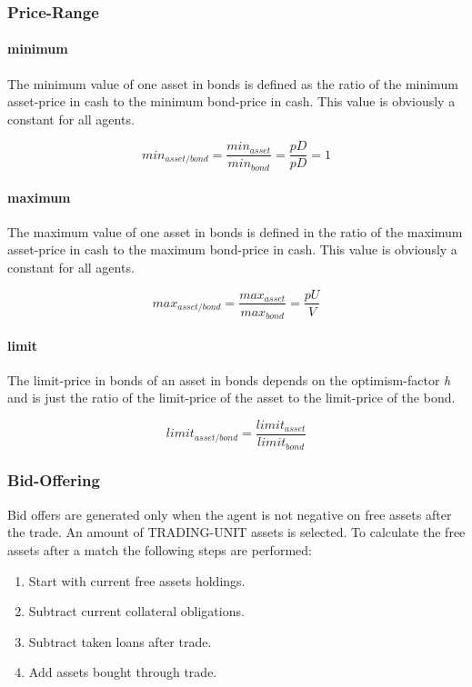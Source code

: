 \documentclass[Bachelorarbeit.tex]{subfiles}
\begin{document}
\subsubsection{Price-Range}

\paragraph{minimum}
The minimum value of one asset in bonds is defined as the ratio of the minimum asset-price in cash to the minimum bond-price in cash. This value is obviously a constant for all agents.

\begin{equation}
min_{asset/bond} = \frac{min_{asset}}{min_{bond}} = \frac{pD}{pD} = 1
\end{equation}
 
\paragraph{maximum}
The maximum value of one asset in bonds is defined in the ratio of the maximum asset-price in cash to the maximum bond-price in cash. This value is obviously a constant for all agents.

\begin{equation}
max_{asset/bond} = \frac{max_{asset}}{max_{bond}} = \frac{pU}{V}
\end{equation}

\paragraph{limit}
The limit-price in bonds of an asset in bonds depends on the optimism-factor \textit{h} and is just the ratio of the limit-price of the asset to the limit-price of the bond.

\begin{equation}
limit_{asset/bond} = \frac{limit_{asset}}{limit_{bond}}
\end{equation}

\subsubsection{Bid-Offering}
Bid offers are generated only when the agent is not negative on free assets after the trade. An amount of TRADING-UNIT assets is selected. To calculate the free assets after a match the following steps are performed:

\begin{enumerate}
\item Start with current free assets holdings.
\item Subtract current collateral obligations.
\item Subtract taken loans after trade.
\item Add assets bought through trade.
\end{enumerate}
\end{document}
